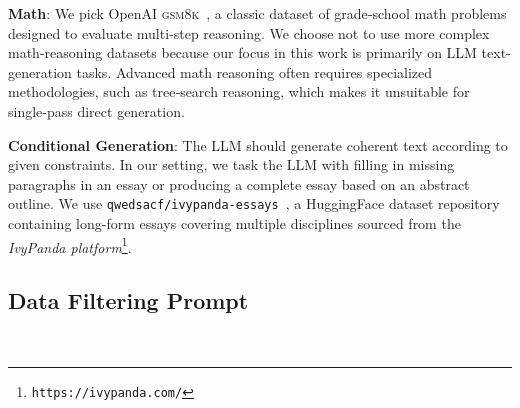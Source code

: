 \noindent\textbf{Math}: We pick OpenAI \textsc{gsm8k}~\citep{gsm8k}, a classic dataset of grade‑school math problems designed to evaluate multi‑step reasoning. We choose not to use more complex math-reasoning datasets because our focus in this work is primarily on LLM text-generation tasks. Advanced math reasoning often requires specialized methodologies, such as tree‑search reasoning, which makes it unsuitable for single-pass direct generation.

\noindent\textbf{Conditional Generation}: The LLM should generate coherent text according to given constraints. In our setting, we task the LLM with filling in missing paragraphs in an essay or producing a complete essay based on an abstract outline. We use \texttt{qwedsacf/ivypanda-essays}~\citep{ivypanda}, a HuggingFace dataset repository containing long-form essays covering multiple disciplines sourced from the \textit{IvyPanda platform}\footnote{\texttt{https://ivypanda.com/}}.


\subsection{Data Filtering Prompt} ~\label{apd:prompt_for_data_filter}

